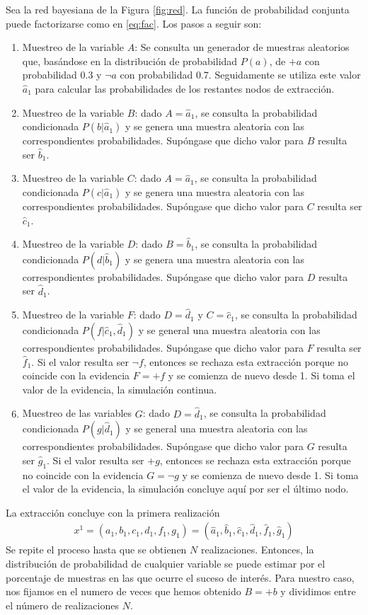 \documentclass[12pt,a4paper]{article}
\begin{document}
\begin{description}
    Sea la red bayesiana de la Figura \ref{fig:red}. La función de probabilidad conjunta puede factorizarse como en \eqref{eq:fac}. Los pasos a seguir son:
    \begin{enumerate}
        \item Muestreo de la variable $A$: Se consulta un generador de muestras aleatorios que, basándose en la distribución de probabilidad $P(a)$, de $+a$ con probabilidad 0.3 y $\neg a$ con probabilidad 0.7. Seguidamente se utiliza este valor $\hat{a}_1$ para calcular las probabilidades de los restantes nodos de extracción. 
        \item Muestreo de la variable $B$: dado $A=\hat{a}_1$, se consulta la probabilidad condicionada $P(b | \hat{a}_1)$ y se genera una muestra aleatoria con las correspondientes probabilidades. Supóngase que dicho valor para $B$ resulta ser $\hat{b}_1$. 
        \item Muestreo de la variable $C$: dado $A=\hat{a}_1$, se consulta la probabilidad condicionada $P(c | \hat{a}_1)$ y se genera una muestra aleatoria con las correspondientes probabilidades. Supóngase que dicho valor para $C$ resulta ser $\hat{c}_1$. 
        \item Muestreo de la variable $D$: dado $B=\hat{b}_1$, se consulta la probabilidad condicionada $P(d | \hat{b}_1)$ y se genera una muestra aleatoria con las correspondientes probabilidades. Supóngase que dicho valor para $D$ resulta ser $\hat{d}_1$. 
        \item Muestreo de la variable $F$: dado $D=\hat{d}_1$ y $C=\hat{c}_1$, se consulta la probabilidad condicionada $P(f | \hat{c}_1, \hat{d}_1)$ y se general una muestra aleatoria con las correspondientes probabilidades. Supóngase que dicho valor para $F$ resulta ser $\hat{f}_1$. Si el valor resulta ser $\neg f$, entonces se rechaza esta extracción porque no coincide con la evidencia $F = + f$ y se comienza de nuevo desde 1. Si toma el valor de la evidencia, la simulación continua. 
        \item Muestreo de las variables $G$: dado $D=\hat{d}_1$, se consulta la probabilidad condicionada $P(g | \hat{d}_1)$ y se general una muestra aleatoria con las correspondientes probabilidades. Supóngase que dicho valor para $G$ resulta ser $\hat{g}_1$. Si el valor resulta ser $+ g$, entonces se rechaza esta extracción porque no coincide con la evidencia $G = \neg g$ y se comienza de nuevo desde 1. Si toma el valor de la evidencia, la simulación concluye aquí por ser el último nodo. 
    \end{enumerate}
    La extracción concluye con la primera realización 
    \begin{align*}
        x^1 = (a_1, b_1, c_1, d_1, f_1, g_1) = (\hat{a}_1, \hat{b}_1, \hat{c}_1, \hat{d}_1, \hat{f}_1, \hat{g}_1)
    \end{align*}
    Se repite el proceso hasta que se obtienen $N$ realizaciones. Entonces, la distribución de probabilidad de cualquier variable se puede estimar por el porcentaje de muestras en las que ocurre el suceso de interés. Para nuestro caso, nos fijamos en el numero de veces que hemos obtenido $B=+b$ y dividimos entre el número de realizaciones $N$.


\end{description}
\end{document}
